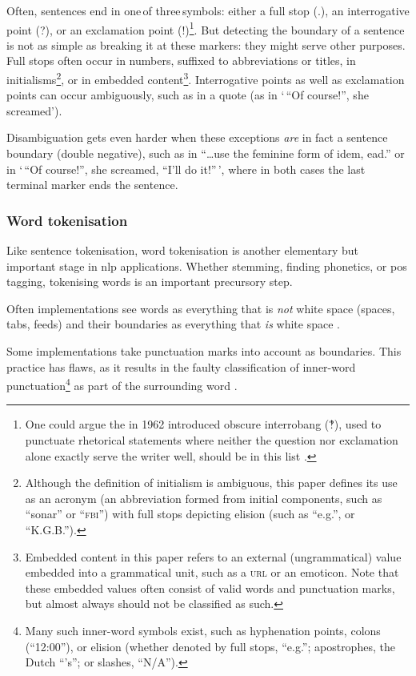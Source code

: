 Often, sentences end in one\,of three\,symbols: either a full stop (.),
  an interrogative point (?), or an exclamation point (!)\footnote{One
    could argue the in 1962 introduced
    obscure interrobang (‽), used to punctuate rhetorical statements where
    neither the question nor exclamation alone exactly serve the writer
    well, should be in this list \autocite{interrobang-mks.com}.}.
But detecting the boundary of a sentence is not as simple as breaking it at
  these markers: they might serve other purposes.
Full stops often occur in numbers, suffixed to abbreviations or titles,
  in initialisms\footnote{Although
    the definition of initialism is ambiguous, this paper defines its use
    as an acronym (an abbreviation formed from initial components, such as
    ``sonar'' or ``\textsc{fbi}'') with full stops depicting elision (such as
    ``e.g.'', or ``K.G.B.'').},
  or in embedded content\footnote{Embedded
      content in this paper refers to an external (ungrammatical) value
      embedded into a grammatical unit, such as a \textsc{url} or an emoticon.
    Note that these embedded values often consist of valid words and
      punctuation marks, but almost always should not be classified as such.}.
Interrogative points as well as exclamation points can occur ambiguously,
  such as in a quote (as in `\,``Of course!'', she screamed').

Disambiguation gets even harder when these exceptions \emph{are} in fact a
  sentence boundary (double negative), such as in
  ``\ldots{}use the feminine form of idem, ead.'' or in
  `\,``Of course!'', she screamed, ``I'll do it!''\,', where in both
  cases the last terminal marker ends the sentence.

\subsubsection{Word tokenisation}\label{word-tokenisation}

Like sentence tokenisation, word tokenisation is another elementary but
important stage in \gls{nlp} applications. Whether stemming, finding
phonetics, or \gls{pos} tagging, tokenising words is an important
precursory step.

Often implementations see words as everything that is \emph{not} white
  space (spaces, tabs, feeds) and their boundaries as everything that
  \emph{is} white space \autocite{loadfive/knwl-source-code}.

Some implementations take punctuation marks into account as boundaries.
This practice has flaws, as it results in the faulty classification of
  inner-word punctuation\footnote{Many such inner-word symbols exist, such
    as hyphenation points, colons (``12:00''), or elision (whether denoted
    by full stops, ``e.g.''; apostrophes, the Dutch ``'s''; or slashes,
    ``N/A'').}
  as part of the surrounding word \autocite{NaturalNode/natural-source-code}.


